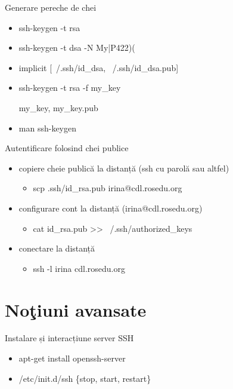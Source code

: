 \documentclass{beamer}
\begin{document}
\begin{frame}{Generare pereche de chei}
  \begin{itemize}
    \item ssh-keygen -t rsa
    \item ssh-keygen -t dsa -N My|P422)(
    \item implicit [~/.ssh/id\_dsa, ~/.ssh/id\_dsa.pub]
    \item ssh-keygen -t rsa -f my\_key
    \item [my\_key, my\_key.pub]
    \item man ssh-keygen
  \end{itemize}
\end{frame}

\begin{frame}{Autentificare folosind chei publice}
  \begin{itemize}
    \pause \item copiere cheie publică la distanță (ssh cu parolă sau altfel)
      \begin{itemize}
        \pause \item scp .ssh/id\_rsa.pub irina@cdl.rosedu.org
      \end{itemize}
    \pause \item configurare cont la distanță (irina@cdl.rosedu.org)
      \begin{itemize}
        \pause \item cat id\_rsa.pub >> ~/.ssh/authorized\_keys
      \end{itemize}
    \pause \item conectare la distanță
      \begin{itemize}
        \pause \item ssh -l irina cdl.rosedu.org
      \end{itemize}
  \end{itemize}
\end{frame}

\section{No\c{t}iuni avansate}
\frame{\tableofcontents[currentsection]}

\begin{frame}{Instalare și interacțiune server SSH}
  \begin{itemize}
    \item apt-get install openssh-server
    \item /etc/init.d/ssh \{stop, start, restart\}
  \end{itemize}
\end{frame}
\end{document}
